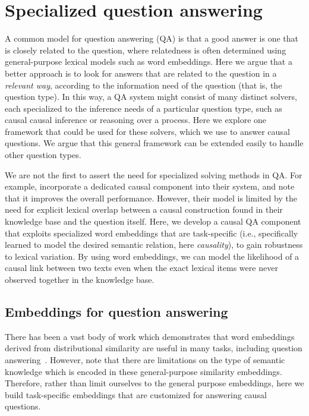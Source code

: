 \section{Specialized question answering}

A common model for question answering (QA) is that a good answer is one that is closely related to the question, where relatedness is often determined using general-purpose lexical models such as word embeddings. 
Here we argue that a better approach is to look for answers that are related to the question in a {\em relevant way}, according to the information need of the question (that is, the question type).
In this way, a QA system might consist of many distinct solvers, each specialized to the inference needs of a particular question type, such as causal causal inference or reasoning over a process.  Here we explore one framework that could be used for these solvers, which we use to answer causal questions.  We argue that this general framework can be extended easily to handle other question types.

We are not the first to assert the need for specialized solving methods in QA.  For example, \citet{oh2013question} incorporate a dedicated causal component into their system, and note that it improves the overall performance.  However, their model is limited by the need for explicit lexical overlap between a causal construction found in their knowledge base and the question itself.  Here, we develop a causal QA component that exploits specialized word embeddings that are task-specific (i.e., specifically learned to model the desired semantic relation, here \textit{causality}), to gain robustness to lexical variation.  
By using word embeddings, we can model the likelihood of a causal link between two texts even when the exact lexical items were never observed together in the knowledge base.

\subsection{Embeddings for question answering}
There has been a vast body of work which demonstrates that word embeddings derived from distributional similarity are useful in many tasks, including question answering~\mbox{\citep[see \emph{inter alia}][]{fried2015higher,yih13}}.  However, \citet{levy2015supervised} note that there are limitations on the type of semantic knowledge which is encoded in these general-purpose similarity embeddings.  Therefore, rather than limit ourselves to the general purpose embeddings, here we build task-specific embeddings that are customized for answering causal questions.


